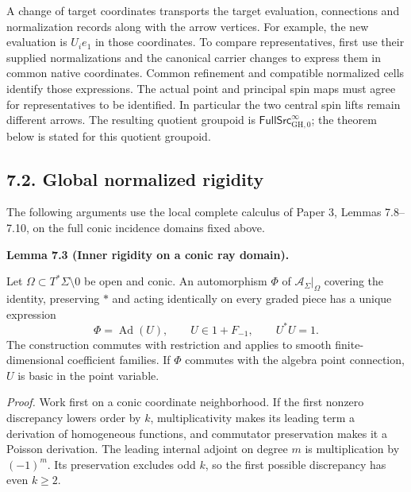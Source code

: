 \documentclass[
  english,
  11pt,
  reqno]{amsart}
\makeatletter
\newcommand{\pandocstatementheading}[1]{%
  \par\if@nobreak\else
    \addpenalty{\@beginparpenalty}%
    \addvspace{.5\baselineskip plus .2\baselineskip minus .2\baselineskip}%
  \fi
  {\normalfont\bfseries #1\par}%
  \nobreak\@afterindenttrue\@afterheading
}
\makeatother
\begin{document}
A change of target coordinates transports the target evaluation,
connections and normalization records along with the arrow vertices. For
example, the new evaluation is \(U_i e_1\) in those coordinates. To
compare representatives, first use their supplied normalizations and the
canonical carrier changes to express them in common native coordinates.
Common refinement and compatible normalized cells identify those
expressions. The actual point and principal spin maps must agree for
representatives to be identified. In particular the two central spin
lifts remain different arrows. The resulting quotient groupoid is
\(\mathsf{FullSrc}^{\infty}_{\mathrm{GH},0}\); the theorem below is
stated for this quotient groupoid.

\protect{}\label{sec:global-normalized-rigidity}

\subsection{7.2. Global normalized
rigidity}\label{global-normalized-rigidity}

The following arguments use the local complete calculus of Paper 3,
Lemmas 7.8--7.10, on the full conic incidence domains fixed above.

\pandocstatementheading{\protect{}\label{lem:global-normalized-inner-rigidity}Lemma 7.3 (Inner rigidity on a conic ray domain).}

Let \(\Omega\subset T^*\Sigma\setminus0\) be open and conic. An
automorphism \(\Phi\) of \(\mathcal A_\Sigma|_\Omega\) covering the
identity, preserving \(*\) and acting identically on every graded piece
has a unique expression \[
\Phi=\operatorname{Ad}(U),
\qquad U\in1+F_{-1},\qquad U^*U=1.
\] The construction commutes with restriction and applies to smooth
finite-dimensional coefficient families. If \(\Phi\) commutes with the
algebra point connection, \(U\) is basic in the point variable.

\emph{Proof.} Work first on a conic coordinate neighborhood. If the
first nonzero discrepancy lowers order by \(k\), multiplicativity makes
its leading term a derivation of homogeneous functions, and commutator
preservation makes it a Poisson derivation. The leading internal adjoint
on degree \(m\) is multiplication by \((-1)^m\). Its preservation
excludes odd \(k\), so the first possible discrepancy has even
\(k\ge2\).
\end{document}
